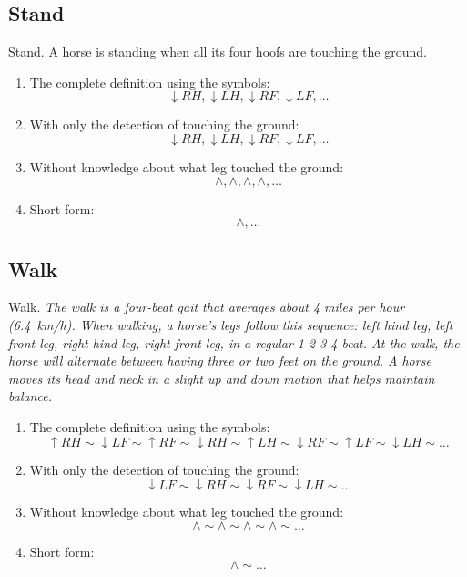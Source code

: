 \subsection{Stand}
\begin{definition}{Stand.}
    \label{def:stand}
    A horse is standing when all its four hoofs are touching the ground. \cite{Harrisc1993}
    
    \begin{enumerate}
        \item The complete definition using the symbols:
        $$ \downarrow RH, \downarrow LH, \downarrow RF, \downarrow LF, \dots $$
        \item With only the detection of touching the ground:
        $$ \downarrow RH, \downarrow LH, \downarrow RF, \downarrow LF, \dots $$
        \item Without knowledge about what leg touched the ground:
        $$ \wedge, \wedge, \wedge, \wedge, \dots $$
        \item Short form:
        $$ \wedge, \dots $$
    \end{enumerate}
\end{definition}

\subsection{Walk}
\begin{definition}{Walk.}
    \label{def:walk}
    \textit{The walk is a four-beat gait that averages about 4 miles per hour (\SI{6.4}{km/h}). When walking, a horse's legs follow this sequence: left hind leg, left front leg, right hind leg, right front leg, in a regular 1-2-3-4 beat. At the walk, the horse will alternate between having three or two feet on the ground. A horse moves its head and neck in a slight up and down motion that helps maintain balance.} \cite{Harrisc1993}
    
    \begin{enumerate}
        \item The complete definition using the symbols:
        $$ \uparrow RH \sim \downarrow LF \sim \uparrow RF \sim \downarrow RH \sim \uparrow LH \sim \downarrow RF \sim \uparrow LF \sim \downarrow LH \sim \dots $$
        \item With only the detection of touching the ground:
        $$ \downarrow LF \sim \downarrow RH \sim \downarrow RF \sim \downarrow LH \sim \dots $$
        \item Without knowledge about what leg touched the ground:
        $$ \wedge \sim \wedge \sim \wedge \sim \wedge \sim \dots $$
        \item Short form:
        $$ \wedge \sim \dots $$
    \end{enumerate}
\end{definition}

